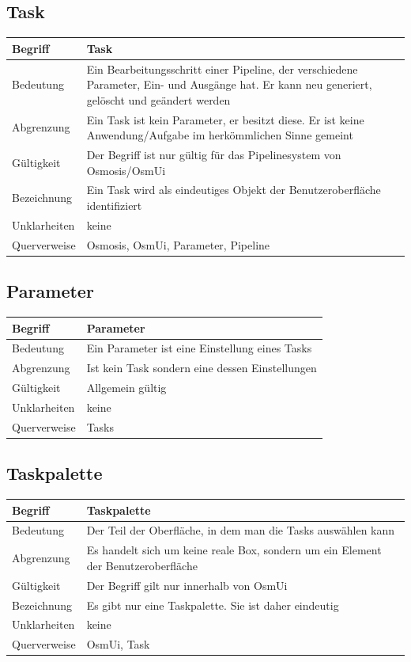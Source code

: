 \documentclass[a4paper,12pt]{scrartcl}
\begin{document}
\begin{center}
\subsection{Task}
\begin{tabular}{|p{5cm}|p{10cm}|}
\hline Begriff & \textbf{Task} \\ 
\hline Bedeutung & Ein Bearbeitungsschritt einer Pipeline, der verschiedene Parameter, Ein- und Ausgänge hat. Er kann neu generiert, gelöscht und geändert werden\\ 
\hline Abgrenzung & Ein Task ist kein Parameter, er besitzt diese. Er ist keine Anwendung/Aufgabe im herkömmlichen Sinne gemeint\\ 
\hline Gültigkeit & Der Begriff ist nur gültig für das Pipelinesystem von Osmosis/OsmUi\\ 
\hline Bezeichnung & Ein Task wird als eindeutiges Objekt der Benutzeroberfläche identifiziert\\ 
\hline Unklarheiten & keine \\ 
\hline Querverweise & Osmosis, OsmUi, Parameter, Pipeline\\ 
\hline 
\end{tabular}
\subsection{Parameter}
\begin{tabular}{|p{5cm}|p{10cm}|}
\hline Begriff & \textbf{Parameter} \\ 
\hline Bedeutung & Ein Parameter ist eine Einstellung eines Tasks\\
\hline Abgrenzung & Ist kein Task sondern eine dessen Einstellungen\\ 
\hline Gültigkeit & Allgemein gültig\\  
\hline Unklarheiten & keine \\ 
\hline Querverweise & Tasks \\ 
\hline 
\end{tabular}
\subsection{Taskpalette}
\begin{tabular}{|p{5cm}|p{10cm}|}
\hline Begriff & \textbf{Taskpalette} \\ 
\hline Bedeutung & Der Teil der Oberfläche, in dem man die Tasks auswählen kann  \\ 
\hline Abgrenzung & Es handelt sich um keine reale Box, sondern um ein Element der Benutzeroberfläche\\ 
\hline Gültigkeit & Der Begriff gilt nur innerhalb von OsmUi \\ 
\hline Bezeichnung & Es gibt nur eine Taskpalette. Sie ist daher eindeutig \\ 
\hline Unklarheiten & keine \\ 
\hline Querverweise & OsmUi, Task\\ 
\hline 
\end{tabular}

\end{center}
\end{document}
